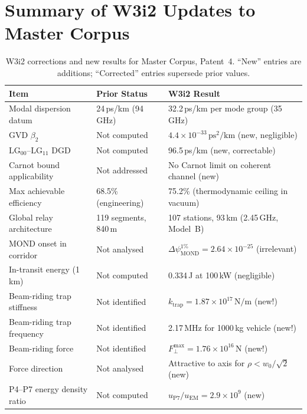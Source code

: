 \documentclass[aps,prd,twocolumn,superscriptaddress]{revtex4-2}
\newcommand{\LG}{\mathrm{LG}}
\begin{document}
\section*{Summary of W3i2 Updates to Master Corpus}
\label{sec:corrections}

\begin{table}[h]
\caption{W3i2 corrections and new results for Master Corpus, Patent~4.
``New'' entries are additions; ``Corrected'' entries supersede prior values.}
\label{tab:corrections}
\begin{ruledtabular}
\begin{tabular}{lll}
Item & Prior Status & W3i2 Result \\
\hline
Modal dispersion datum & 24\,ps/km (94\,GHz) &
  32.2\,ps/km per mode group (35\,GHz) \\
GVD $\beta_2$ & Not computed &
  $4.4\times10^{-33}\,\mathrm{ps}^2/\mathrm{km}$ (new, negligible) \\
$\LG_{00}$--$\LG_{11}$ DGD & Not computed &
  96.5\,ps/km (new, correctable) \\
Carnot bound applicability & Not addressed &
  No Carnot limit on coherent channel (new) \\
Max achievable efficiency & 68.5\% (engineering) &
  75.2\% (thermodynamic ceiling in vacuum) \\
Global relay architecture & 119 segments, 840\,m &
  107 stations, 93\,km (2.45\,GHz, Model~B) \\
MOND onset in corridor & Not analysed &
  $\Delta\psi_\mathrm{MOND}^{1\%} = 2.64\times10^{-25}$ (irrelevant) \\
In-transit energy (1\,km) & Not computed &
  0.334\,J at 100\,kW (negligible) \\
Beam-riding trap stiffness & Not identified &
  $k_\mathrm{trap} = 1.87\times10^{17}\,\mathrm{N/m}$ (new!) \\
Beam-riding trap frequency & Not identified &
  2.17\,MHz for 1000\,kg vehicle (new!) \\
Beam-riding force & Not identified &
  $F_\perp^\mathrm{max} = 1.76\times10^{16}\,\mathrm{N}$ (new!) \\
Force direction & Not analysed &
  Attractive to axis for $\rho < w_0/\sqrt{2}$ (new) \\
P4--P7 energy density ratio & Not computed &
  $u_\mathrm{P7}/u_\mathrm{EM} = 2.9\times10^9$ (new) \\
\end{tabular}
\end{ruledtabular}
\end{table}
\end{document}
